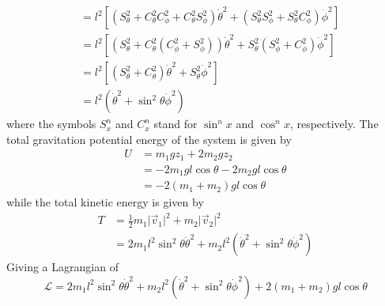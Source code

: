 \documentclass[12pt]{article}
\newcommand{\magsq}[1]{\big|#1\big|^2}
\begin{document}
\begin{enumerate}[label=(\alph*)]
\begin{align*}
        &= l^2\left[ \left(S_\theta^2 + C_\theta^2C_\phi^2 + C_\theta^2S_\phi^2\right)\dot{\theta}^2 + \left(S_\theta^2S_\phi^2 + S_\theta^2C_\phi^2\right)\dot{\phi}^2 \right] \\
        &= l^2\left[ \left(S_\theta^2 + C_\theta^2\left(C_\phi^2 + S_\phi^2\right)\right)\dot{\theta}^2 + S_\theta^2\left(S_\phi^2 + C_\phi^2\right)\dot{\phi}^2 \right] \\
        &= l^2\left[ \left(S_\theta^2 + C_\theta^2\right)\dot{\theta}^2 + S_\theta^2\dot{\phi}^2\right] \\
        &= l^2\left(\dot{\theta}^2 + \sin^2\theta\dot{\phi}^2\right)
    \end{align*}
    where the symbols $S_x^n$ and  $C_x^n$ stand for $\sin^n x$ and  $\cos^n x$, respectively.
    The total gravitation potential energy of the system is given by
    \begin{align*}
        U &= m_1gz_1 + 2m_2gz_2 \\
        &= -2m_1gl\cos\theta - 2m_2gl\cos\theta \\
        &= -2(m_1 + m_2)gl\cos\theta
    \end{align*}
    while the total kinetic energy is given by
    \begin{align*}
        T &= \frac{1}{2}m_1\magsq{\vec{v}_1} + m_2\magsq{\vec{v}_2} \\
        &= 2m_1l^2\sin^2\theta\dot{\theta}^2 + m_2l^2\left(\dot{\theta}^2 + \sin^2\theta\dot{\phi}^2\right)
    \end{align*}
    Giving a Lagrangian of 
    \[ \boxed{\mathscr{L} = 2m_1l^2\sin^2\theta\dot{\theta}^2 + m_2l^2\left(\dot{\theta}^2 + \sin^2\theta\dot{\phi}^2\right) + 2(m_1 + m_2)gl\cos\theta} \]
    

\end{enumerate}
\end{document}
